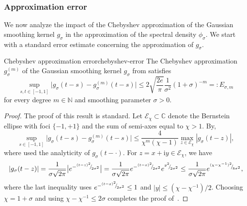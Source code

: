 \subsubsection{Approximation error}
\label{subsubsec:approximation-error}

We now analyze the impact of the Chebyshev approximation of the Gaussian smoothing kernel $g_{\sigma}$ in the approximation of the spectral density $\phi_{\sigma}$. We start with a standard error estimate concerning the approximation of $g_{\sigma}$.

\begin{lemma}{Chebyshev approximation error}{chebyshev-error}
    The Chebyshev approximation $g_{\sigma}^{(m)}$ of the Gaussian smoothing kernel $g_{{\sigma}}$ from   satisfies
    \begin{equation}
        \sup_{s,t \in [-1, 1]} \big| g_{\sigma}(t - s) - g_{\sigma}^{(m)}(t - s) \big| \leq 2\sqrt{\frac{2e}{\pi}} \frac{1}{\sigma^2} (1 + \sigma)^{-m} =: E_{\sigma, m}
        \label{equ:chebyshev-interpolation-sup-error-kernel}
    \end{equation}
    for every degree $m \in \mathbb{N}$ and smoothing parameter $\sigma > 0$.
\end{lemma}
\begin{proof}
    The proof of this result is standard. %
    Let $\mathcal{E}_{\chi} \subset \mathbb{C}$ denote the Bernstein ellipse  with foci $\{-1, +1\}$ and the sum of semi-axes equal to $\chi > 1$. By\cite[Theorem 8.2]{trefethen-2020-approximation-theory},
    \begin{equation*}
        \sup_{s \in [-1, 1]} \big| g_{\sigma}(t - s) - g_{\sigma}^{(m)}(t - s) \big| \leq \frac{4}{\chi^m (\chi - 1)} \max_{z \in \mathcal{E}_{\chi}} |g_{\sigma}(t - z)|,
        \label{equ:bernstein-bound}
    \end{equation*}
    where used the analyticity of $g_{\sigma}(t- \cdot)$.
    For $z = x + \mathrm{i} y \in \mathcal{E}_{\chi}$, we have
    \begin{equation*}
    | g_{\sigma}(t - z) | 
    = \frac{1}{\sigma \sqrt{2 \pi}} \big| e^{-{}^{(t - z)^2}{\mskip -5mu/\mskip -3mu}_{2\sigma^2}} \big|
    = \frac{1}{\sigma \sqrt{2 \pi}} e^{-{}^{(t - x)^2}{\mskip -5mu/\mskip -3mu}_{2\sigma^2}}e^{{}^{y^2}{\mskip -5mu/\mskip -3mu}_{2\sigma^2}}
    \le \frac{1}{\sigma \sqrt{2 \pi}} e^{{}^{(\chi - \chi^{-1})^2}{\mskip -5mu/\mskip -3mu}_{8 \sigma^2}},
    \end{equation*}
    where the last inequality uses 
    $e^{-{}^{(t - x)^2}{\mskip -5mu/\mskip -3mu}_{2\sigma^2}} \leq 1$ and $|y| \le (\chi - \chi^{-1}) / 2$.
    Choosing $\chi = 1 + \sigma$ and using $\chi - \chi^{-1} \leq 2\sigma$ completes the proof of~.
\end{proof}

